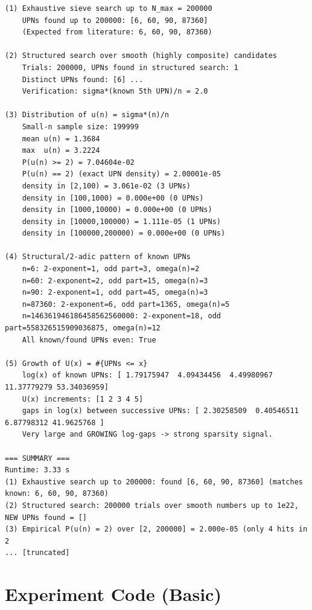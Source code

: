 \documentclass[11pt]{article}
\begin{document}
\begin{lstlisting}
(1) Exhaustive sieve search up to N_max = 200000
    UPNs found up to 200000: [6, 60, 90, 87360]
    (Expected from literature: 6, 60, 90, 87360)

(2) Structured search over smooth (highly composite) candidates
    Trials: 200000, UPNs found in structured search: 1
    Distinct UPNs found: [6] ...
    Verification: sigma*(known 5th UPN)/n = 2.0

(3) Distribution of u(n) = sigma*(n)/n
    Small-n sample size: 199999
    mean u(n) = 1.3684
    max  u(n) = 3.2224
    P(u(n) >= 2) = 7.04604e-02
    P(u(n) == 2) (exact UPN density) = 2.00001e-05
    density in [2,100) = 3.061e-02 (3 UPNs)
    density in [100,1000) = 0.000e+00 (0 UPNs)
    density in [1000,10000) = 0.000e+00 (0 UPNs)
    density in [10000,100000) = 1.111e-05 (1 UPNs)
    density in [100000,200000) = 0.000e+00 (0 UPNs)

(4) Structural/2-adic pattern of known UPNs
    n=6: 2-exponent=1, odd part=3, omega(n)=2
    n=60: 2-exponent=2, odd part=15, omega(n)=3
    n=90: 2-exponent=1, odd part=45, omega(n)=3
    n=87360: 2-exponent=6, odd part=1365, omega(n)=5
    n=146361946186458562560000: 2-exponent=18, odd part=558326515909036875, omega(n)=12
    All known/found UPNs even: True

(5) Growth of U(x) = #{UPNs <= x}
    log(x) of known UPNs: [ 1.79175947  4.09434456  4.49980967 11.37779279 53.34036959]
    U(x) increments: [1 2 3 4 5]
    gaps in log(x) between successive UPNs: [ 2.30258509  0.40546511  6.87798312 41.9625768 ]
    Very large and GROWING log-gaps -> strong sparsity signal.

=== SUMMARY ===
Runtime: 3.33 s
(1) Exhaustive search up to 200000: found [6, 60, 90, 87360] (matches known: 6, 60, 90, 87360)
(2) Structured search: 200000 trials over smooth numbers up to 1e22, NEW UPNs found = []
(3) Empirical P(u(n) = 2) over [2, 200000] = 2.000e-05 (only 4 hits in 2
... [truncated]
\end{lstlisting}


\section{Experiment Code (Basic)}
\end{document}
